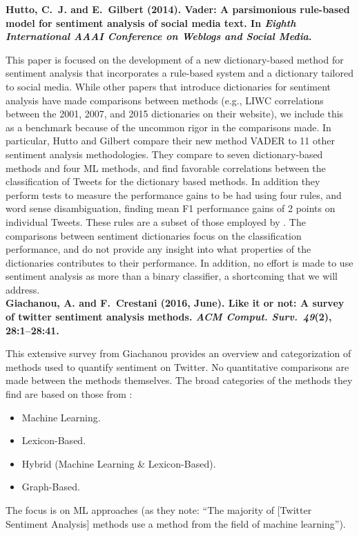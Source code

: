 {%

\noindent \textbf{Hutto, C.~J. and E.~Gilbert (2014).
Vader: A parsimonious rule-based model for sentiment analysis of
  social media text.
In {\em Eighth International AAAI Conference on Weblogs and Social
  Media}.}

\noindent This paper is focused on the development of a new dictionary-based method for sentiment analysis that incorporates a rule-based system and a dictionary tailored to social media.
While other papers that introduce dictionaries for sentiment analysis have made comparisons between methods (e.g., LIWC correlations between the 2001, 2007, and 2015 dictionaries on their website), we include this as a benchmark because of the uncommon rigor in the comparisons made.
In particular, Hutto and Gilbert compare their new method VADER to 11 other sentiment analysis methodologies.
They compare to seven dictionary-based methods and four ML methods, and find favorable correlations between the classification of Tweets for the dictionary based methods.
In addition they perform tests to measure the performance gains to be had using four rules, and word sense disambiguation, finding mean F1 performance gains of 2 points on individual Tweets.
These rules are a subset of those employed by \cite{thelwall2012sentiment}.
The comparisons between sentiment dictionaries focus on the classification performance, and do not provide any insight into what properties of the dictionaries contributes to their performance.
In addition, no effort is made to use sentiment analysis as more than a binary classifier, a shortcoming that we will address.\\

\noindent \textbf{Giachanou, A. and F.~Crestani (2016, June).
Like it or not: A survey of twitter sentiment analysis methods.
{\em ACM Comput. Surv.\/}~{\em 49\/}(2), 28:1--28:41.}

\noindent This extensive survey from Giachanou \etal provides an overview and categorization of methods used to quantify sentiment on Twitter.
No quantitative comparisons are made between the methods themselves.
The broad categories of the methods they find are based on those from \cite{liu2012sentiment}:
\begin{itemize}
\item Machine Learning.\vspace{-12pt}
\item Lexicon-Based.\vspace{-12pt}
\item Hybrid (Machine Learning \& Lexicon-Based).\vspace{-12pt}
\item Graph-Based.
\end{itemize}
The focus is on ML approaches (as they note: ``The majority of [Twitter Sentiment Analysis] methods use a method from the field of machine learning'').\\

}
